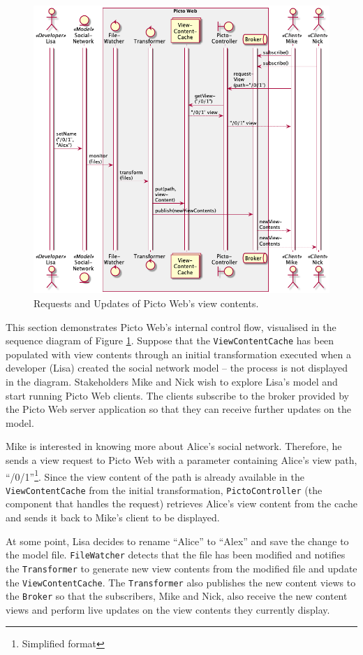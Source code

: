 \documentclass[sigconf,review]{acmart}
\begin{document}
\begin{figure}[h]
  \centering
  \includegraphics[width=0.89\linewidth]{images/sequence.png}
  \caption{Requests and Updates of Picto Web's view contents.}
  \label{fig:sequence}
\end{figure}

This section demonstrates Picto Web's internal control flow, visualised in the sequence diagram of Figure \ref{fig:sequence}. Suppose that the \texttt{ViewContentCache} has been populated with view contents through an initial transformation executed when a developer (Lisa) created the social network model -- the process is not displayed in the diagram. Stakeholders Mike and Nick wish to explore Lisa's model and start running Picto Web clients. The clients subscribe to the broker provided by the Picto Web server application so that they can receive further updates on the model. 

Mike is interested in knowing more about Alice's social network. Therefore, he sends a view request to Picto Web with a parameter containing Alice's view path, ``/0/1''\footnote{Simplified format}. Since the view content of the path is already available in the \texttt{ViewContentCache} from the initial transformation, \texttt{Picto\-Controller} (the component that handles the request) retrieves Alice's view content from the cache and sends it back to Mike's client to be displayed.

At some point, Lisa decides to rename ``Alice'' to ``Alex'' and save the change to the model file. \texttt{FileWatcher} detects that the file has been modified and notifies the \texttt{Transformer} to generate new view contents from the modified file and update the \texttt{ViewContentCache}. The \texttt{Transformer} also publishes the new content views to the \texttt{Broker} so that the subscribers, Mike and Nick, also receive the new content views and perform live updates on the view contents they currently display.
\end{document}
